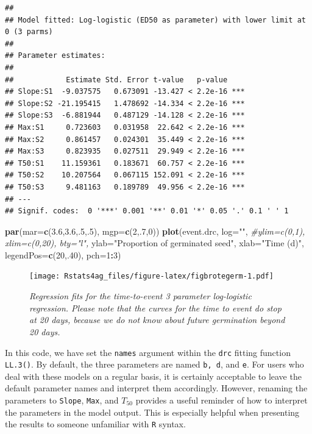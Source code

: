 \documentclass[letterpaper,]{book}
\newenvironment{Shaded}{\begin{snugshade}}{\end{snugshade}}
\newcommand{\CommentTok}[1]{\textcolor[rgb]{0.56,0.35,0.01}{\textit{#1}}}
\newcommand{\DataTypeTok}[1]{\textcolor[rgb]{0.13,0.29,0.53}{#1}}
\newcommand{\DecValTok}[1]{\textcolor[rgb]{0.00,0.00,0.81}{#1}}
\newcommand{\FloatTok}[1]{\textcolor[rgb]{0.00,0.00,0.81}{#1}}
\newcommand{\KeywordTok}[1]{\textcolor[rgb]{0.13,0.29,0.53}{\textbf{#1}}}
\newcommand{\NormalTok}[1]{#1}
\newcommand{\OperatorTok}[1]{\textcolor[rgb]{0.81,0.36,0.00}{\textbf{#1}}}
\newcommand{\StringTok}[1]{\textcolor[rgb]{0.31,0.60,0.02}{#1}}
\begin{document}
\begin{verbatim}
## 
## Model fitted: Log-logistic (ED50 as parameter) with lower limit at 0 (3 parms)
## 
## Parameter estimates:
## 
##            Estimate Std. Error t-value   p-value    
## Slope:S1  -9.037575   0.673091 -13.427 < 2.2e-16 ***
## Slope:S2 -21.195415   1.478692 -14.334 < 2.2e-16 ***
## Slope:S3  -6.881944   0.487129 -14.128 < 2.2e-16 ***
## Max:S1     0.723603   0.031958  22.642 < 2.2e-16 ***
## Max:S2     0.861457   0.024301  35.449 < 2.2e-16 ***
## Max:S3     0.823935   0.027511  29.949 < 2.2e-16 ***
## T50:S1    11.159361   0.183671  60.757 < 2.2e-16 ***
## T50:S2    10.207564   0.067115 152.091 < 2.2e-16 ***
## T50:S3     9.481163   0.189789  49.956 < 2.2e-16 ***
## ---
## Signif. codes:  0 '***' 0.001 '**' 0.01 '*' 0.05 '.' 0.1 ' ' 1
\end{verbatim}

\begin{Shaded}
\begin{Highlighting}[]
\KeywordTok{par}\NormalTok{(}\DataTypeTok{mar=}\KeywordTok{c}\NormalTok{(}\FloatTok{3.6}\NormalTok{,}\FloatTok{3.6}\NormalTok{,.}\DecValTok{5}\NormalTok{,.}\DecValTok{5}\NormalTok{), }\DataTypeTok{mgp=}\KeywordTok{c}\NormalTok{(}\DecValTok{2}\NormalTok{,.}\DecValTok{7}\NormalTok{,}\DecValTok{0}\NormalTok{))}
\KeywordTok{plot}\NormalTok{(event.drc, }\DataTypeTok{log=}\StringTok{""}\NormalTok{, }\CommentTok{#ylim=c(0,1), xlim=c(0,20),  bty="l", }
     \DataTypeTok{ylab=}\StringTok{"Proportion of germinated seed"}\NormalTok{, }\DataTypeTok{xlab=}\StringTok{"Time (d)"}\NormalTok{,}
     \DataTypeTok{legendPos=}\KeywordTok{c}\NormalTok{(}\DecValTok{20}\NormalTok{,.}\DecValTok{40}\NormalTok{), }\DataTypeTok{pch=}\DecValTok{1}\OperatorTok{:}\DecValTok{3}\NormalTok{)}
\end{Highlighting}
\end{Shaded}

\begin{figure}
\centering
\texttt{[image: Rstats4ag\_files/figure-latex/figbrotegerm-1.pdf]}
\caption{\label{fig:figbrotegerm}\emph{Regression fits for the time-to-event 3 parameter log-logistic regression. Please note that the curves for the time to event do stop at 20 days, because we do not know about future germination beyond 20 days.}}
\end{figure}

In this code, we have set the \texttt{names} argument within the \texttt{drc} fitting function \texttt{LL.3()}. By default, the three parameters are named \texttt{b,\ d}, and \texttt{e}. For users who deal with these models on a regular basis, it is certainly acceptable to leave the default parameter names and interpret them accordingly. However, renaming the parameters to \texttt{Slope}, \texttt{Max}, and \(T_{50}\) provides a useful reminder of how to interpret the parameters in the model output. This is especially helpful when presenting the results to someone unfamiliar with \texttt{R} syntax.
\end{document}
